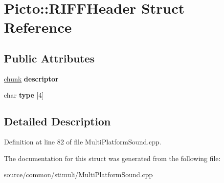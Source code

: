 \hypertarget{struct_picto_1_1_r_i_f_f_header}{\section{Picto\-:\-:R\-I\-F\-F\-Header Struct Reference}
\label{struct_picto_1_1_r_i_f_f_header}
}
\subsection*{Public Attributes}
\begin{DoxyCompactItemize}
\item 
\hypertarget{struct_picto_1_1_r_i_f_f_header_a022fd66851f6bbc5bb533a6e427ee34a}{\hyperlink{struct_picto_1_1chunk}{chunk} {\bfseries descriptor}}\label{struct_picto_1_1_r_i_f_f_header_a022fd66851f6bbc5bb533a6e427ee34a}

\item 
\hypertarget{struct_picto_1_1_r_i_f_f_header_a5edf8b3f70cc47530c9362c0b977b13f}{char {\bfseries type} \mbox{[}4\mbox{]}}\label{struct_picto_1_1_r_i_f_f_header_a5edf8b3f70cc47530c9362c0b977b13f}

\end{DoxyCompactItemize}


\subsection{Detailed Description}


Definition at line 82 of file Multi\-Platform\-Sound.\-cpp.



The documentation for this struct was generated from the following file\-:\begin{DoxyCompactItemize}
\item 
source/common/stimuli/Multi\-Platform\-Sound.\-cpp\end{DoxyCompactItemize}
